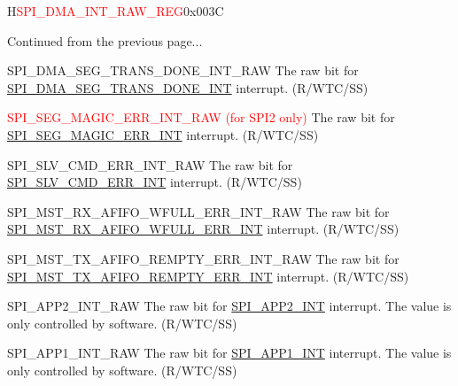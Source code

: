 \addtocounter{Regfloat}{-1}
\begin{register}{H}{\textcolor{red}{SPI\_DMA\_INT\_RAW\_REG}}{0x{}003C}
\begin{regdesc}\begin{reglist}
\item [Continued from the previous page...]
\label{fielddesc:SPIDMASEGTRANSDONEINTRAW}\item [SPI\_DMA\_SEG\_TRANS\_DONE\_INT\_RAW] The raw bit for \hyperref[int:SPIDMASEGTRANSDONEINT]{SPI\_DMA\_SEG\_TRANS\_DONE\_INT} interrupt. (R/WTC/SS)
\label{fielddesc:SPISEGMAGICERRINTRAW}\item [\textcolor{red}{SPI\_SEG\_MAGIC\_ERR\_INT\_RAW (for SPI2 only)}] The raw bit for \hyperref[int:SPISEGMAGICERRINT]{SPI\_SEG\_MAGIC\_ERR\_INT} interrupt. (R/WTC/SS)
\label{fielddesc:SPISLVCMDERRINTRAW}\item [SPI\_SLV\_CMD\_ERR\_INT\_RAW] The raw bit for \hyperref[int:SPISLVCMDERRINT]{SPI\_SLV\_CMD\_ERR\_INT} interrupt. (R/WTC/SS)
\label{fielddesc:SPIMSTRXAFIFOWFULLERRINTRAW}\item [SPI\_MST\_RX\_AFIFO\_WFULL\_ERR\_INT\_RAW] The raw bit for \hyperref[int:SPIMSTRXAFIFOWFULLERRINT]{SPI\_MST\_RX\_AFIFO\_WFULL\_ERR\_INT} interrupt. (R/WTC/SS)
\label{fielddesc:SPIMSTTXAFIFOREMPTYERRINTRAW}\item [SPI\_MST\_TX\_AFIFO\_REMPTY\_ERR\_INT\_RAW] The raw bit for \hyperref[int:SPIMSTTXAFIFOREMPTYERRINT]{SPI\_MST\_TX\_AFIFO\_REMPTY\_ERR\_INT} interrupt. (R/WTC/SS)
\label{fielddesc:SPIAPP2INTRAW}\item [SPI\_APP2\_INT\_RAW] The raw bit for \hyperref[int:SPIAPP2INT]{SPI\_APP2\_INT} interrupt. The value is only controlled by software. (R/WTC/SS)
\label{fielddesc:SPIAPP1INTRAW}\item [SPI\_APP1\_INT\_RAW] The raw bit for \hyperref[int:SPIAPP1INT]{SPI\_APP1\_INT} interrupt. The value is only controlled by software. (R/WTC/SS)
\end{reglist}\end{regdesc}
\end{register}


